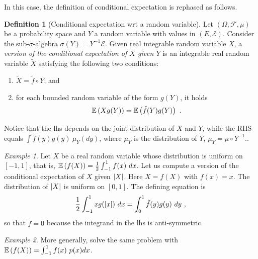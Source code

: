 \documentclass[12pt,a4paper]{amsart}
\theoremstyle{plain}%
\theoremstyle{definition}
\newtheorem{definition}{Definition}%
\theoremstyle{remark}
\newtheorem{example}{Example}
\begin{document}
In this case, the definition of conditional expectation is rephased as
follows.

\begin{definition}[Conditional expectation wrt a random variable]
Let $(\Omega,\mathcal F,\mu)$ be a probability space and $Y$ a random
variable with values in $(E,\mathcal E)$. Consider the
sub-$\sigma$-algebra $\sigma(Y) = Y^{-1} \mathcal E$. Given real integrable random variable $X$, a
\emph{version of the conditional expectation of $X$ given $Y$} is an integrable real random variable $\widetilde X$ satisfying the following two conditions:
\begin{enumerate}
\item $\widetilde X = \tilde f \circ Y$; and
\item for each bounded random variable of the form
  $g(Y)$, it holds
  \begin{equation*}
    \operatorname{\mathbb E}\left(Xg(Y)\right) = \operatorname{\mathbb E}\left(\tilde f(Y) g(Y)\right) \ .
  \end{equation*}
\end{enumerate}
\end{definition}

Notice that the lhs depends on the joint distribution of $X$ and $Y$,
while the RHS equals $\int \tilde f(y)g(y) \ \mu_Y(dy)$, where $\mu_Y$
is the distribution of $Y$, $\mu_Y= \mu \circ Y^{-1}$..

\begin{example}
Let $X$ be a real random variable whose distribution is uniform on
$[-1,1]$, that is, $\operatorname{\mathbb E}\left(f(X)\right) = \frac12 \int_{-1}^1 f(x) \ dx$. Let us
compute a version of the conditional expectation of $X$ given $\left\vert X\right\vert$. Here $X = f(X)$ with $f(x) = x$. The distribution of $\left\vert X\right\vert$ is uniform on $[0,1]$. The defining
equation is
\begin{equation*}
  \frac12 \int_{-1}^1 x g(\left\vert x\right\vert) \ dx = \int_0^1 \tilde f(y) g(y) \
  dy  \ , 
\end{equation*}
so that $\widetilde f = 0$ because the integrand in the lhs is
anti-symmetric. 
\end{example}

\begin{example}
More generally, solve the same problem with $\operatorname{\mathbb E}\left(f(X)\right) = \int_{-1}^1
f(x) \ p(x)dx$.
\end{example}
\end{document}
